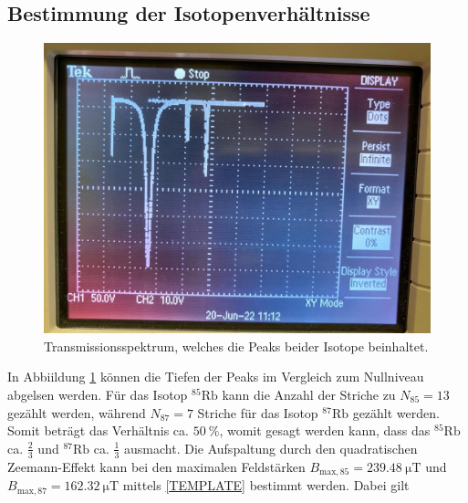 \subsection{Bestimmung der Isotopenverhältnisse}
\begin{figure}
    \centering
    \caption{Transmissionsspektrum, welches die Peaks beider Isotope beinhaltet.}
    \label{fig:transmissionsspektrum}
    \includegraphics[width = 0.7 \textwidth]{data_scripts/index.jpg}
\end{figure}
In Abbiildung \ref{fig:transmissionsspektrum} können die Tiefen der Peaks im Vergleich zum Nullniveau abgelsen werden.
Für das Isotop $^{85}\text{Rb}$ kann die Anzahl der Striche zu $N_{85}=13$ gezählt werden, während 
$N_{87} = 7$ Striche für das Isotop $^{87}\text{Rb}$ gezählt werden.
Somit beträgt das Verhältnis ca. $\qty{50}{\percent}$, womit gesagt werden kann, dass 
das $^{85}\text{Rb}$ ca. $\frac{2}{3}$ und $^{87}\text{Rb}$ ca. $\frac{1}{3}$ ausmacht.
Die Aufspaltung durch den quadratischen Zeemann-Effekt kann bei den maximalen Feldstärken 
$B_{\text{max},85} = \qty{239.48}{\micro\tesla}$ und $B_{\text{max},87} = \qty{162.32}{\micro\tesla}$ mittels \eqref{TEMPLATE} bestimmt werden.
Dabei gilt 
